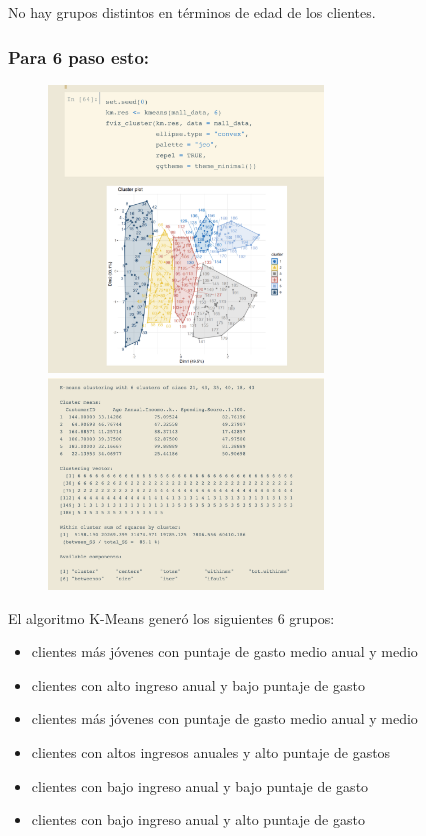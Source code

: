 \documentclass[12pt, fleqn]{report}                             %
\theoremstyle{break}                                            %
\begin{document}
            No hay grupos distintos en términos de edad de los clientes.

            \clearpage
            \subsubsection{Para 6 paso esto:}

            \begin{figure}[ht!]
                \centering
                \includegraphics[width=0.65\textwidth]{k3}
                \includegraphics[width=0.65\textwidth]{k31}
            \end{figure}

            El algoritmo K-Means generó los siguientes 6 grupos:
            \begin{itemize}
                \item clientes más jóvenes con puntaje de gasto  medio  anual y  medio 
                \item clientes con  alto  ingreso anual y  bajo  puntaje de gasto
                \item clientes más jóvenes con puntaje de gasto  medio  anual y  medio 
                \item clientes con  altos  ingresos anuales y  alto  puntaje de gastos
                \item clientes con  bajo  ingreso anual y  bajo  puntaje de gasto
                \item clientes con  bajo  ingreso anual y  alto puntaje de gasto
            \end{itemize}
\end{document}
